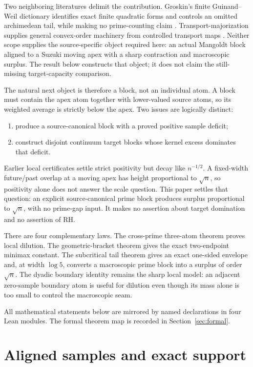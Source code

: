 \documentclass[11pt]{article}
\begin{document}
Two neighboring literatures delimit the contribution.  Groskin's finite Guinand--Weil dictionary
identifies exact finite quadratic forms and controls an omitted archimedean tail, while making no
prime-counting claim \cite{Groskin2026}.  Transport-majorization supplies general convex-order
machinery from controlled transport maps \cite{MelbourneRoberto2021}.  Neither scope supplies the
source-specific object required here: an actual Mangoldt block aligned to a Suzuki moving apex
with a sharp contraction and macroscopic surplus.  The result below constructs that object; it
does not claim the still-missing target-capacity comparison.

The natural next object is therefore a block, not an individual atom.  A block must contain the
apex atom together with lower-valued source atoms, so its weighted average is strictly below the
apex.  Two issues are logically distinct:
\begin{enumerate}
\item produce a source-canonical block with a proved positive sample deficit;
\item construct disjoint continuum target blocks whose kernel excess dominates that deficit.
\end{enumerate}
Earlier local certificates settle strict positivity but decay like $n^{-1/2}$.  A fixed-width
future/past overlap at a moving apex has height proportional to $\sqrt n$, so positivity alone does
not answer the scale question.  This paper settles that question: an explicit source-canonical
prime block produces surplus proportional to $\sqrt n$, with no prime-gap input.  It makes no
assertion about target domination and no assertion of RH.

There are four complementary laws.  The cross-prime three-atom theorem proves local dilution.
The geometric-bracket theorem gives the exact two-endpoint minimax constant.  The subcritical
tail theorem gives an exact one-sided envelope and, at width $\log5$, converts a macroscopic prime
block into a surplus of order $\sqrt n$.  The dyadic boundary identity remains the sharp local
model: an adjacent zero-sample boundary atom is useful for dilution even though its mass alone is
too small to control the macroscopic seam.

All mathematical statements below are mirrored by named declarations in four Lean modules.  The
formal theorem map is recorded in Section~\ref{sec:formal}.

\section{Aligned samples and exact support}\leavevmode\par
\end{document}
